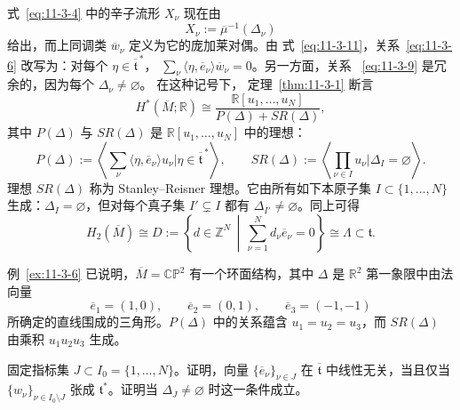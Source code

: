 式~\eqref{eq:11-3-4} 中的辛子流形 $X_\nu$ 现在由
\[
  X_\nu:=\overline\mu^{-1}(\Delta_\nu)
\]
给出，而上同调类 $\overline w_\nu$ 定义为它的庞加莱对偶。由
式~\eqref{eq:11-3-11}，关系~\eqref{eq:11-3-6} 改写为：对每个
$\eta\in\overline{\mathfrak t}^{\,*}$，
$\sum_\nu\langle\eta,\overline e_\nu\rangle\overline w_\nu=0$。另一方面，关系
~\eqref{eq:11-3-9} 是冗余的，因为每个 $\Delta_\nu\ne\varnothing$。
在这种记号下，
定理~\ref{thm:11-3-1} 断言
\[
  H^*(\overline M;\mathbb R)\cong
  \frac{\mathbb R[u_1,\ldots,u_N]}{P(\Delta)+SR(\Delta)},
\]
其中 $P(\Delta)$ 与 $SR(\Delta)$ 是 $\mathbb R[u_1,\ldots,u_N]$ 中的理想：
\[
  P(\Delta):=
  \left\langle\sum_\nu\langle\eta,\overline e_\nu\rangle u_\nu
  \mathrel{\Big|}\eta\in\overline{\mathfrak t}^{\,*}\right\rangle,
  \qquad
  SR(\Delta):=
  \left\langle\prod_{\nu\in I}u_\nu
  \mathrel{\Big|}\Delta_I=\varnothing\right\rangle.
\]
理想 $SR(\Delta)$ 称为 Stanley--Reisner 理想。它由所有如下本原子集
$I\subset\{1,\ldots,N\}$ 生成：$\Delta_I=\varnothing$，但对每个真子集
$I'\subsetneq I$ 都有 $\Delta_{I'}\ne\varnothing$。同上可得
\begin{equation}\label{eq:11-3-13}
  H_2(\overline M)\cong
  D:=\left\{d\in\mathbb Z^N\,\middle|\,
  \sum_{\nu=1}^Nd_\nu\overline e_\nu=0\right\}
  \cong\Lambda\subset\mathfrak t.
\end{equation}

\begin{example}\label{ex:11-3-7}
例~\ref{ex:11-3-6} 已说明，$\overline M=\mathbb{CP}^2$ 有一个环面结构，其中
$\Delta$ 是 $\mathbb R^2$ 第一象限中由法向量
\[
  \overline e_1=(1,0),\qquad
  \overline e_2=(0,1),\qquad
  \overline e_3=(-1,-1)
\]
所确定的直线围成的三角形。$P(\Delta)$ 中的关系蕴含
$u_1=u_2=u_3$，而 $SR(\Delta)$ 由乘积 $u_1u_2u_3$ 生成。
\end{example}

\begin{exercise}\label{ex:11-3-8}
固定指标集 $J\subset I_0=\{1,\ldots,N\}$。证明，向量
$\{\overline e_\nu\}_{\nu\in J}$ 在 $\overline{\mathfrak t}$ 中线性无关，当且仅当
$\{w_\nu\}_{\nu\in I_0\setminus J}$ 张成 $\mathfrak t^*$。证明当
$\Delta_J\ne\varnothing$ 时这一条件成立。
\end{exercise}


